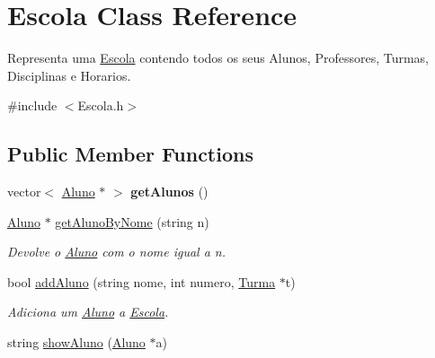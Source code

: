 \hypertarget{class_escola}{\section{Escola Class Reference}
\label{class_escola}
}


Representa uma \hyperlink{class_escola}{Escola} contendo todos os seus Alunos, Professores, Turmas, Disciplinas e Horarios.  




{\ttfamily \#include $<$Escola.\-h$>$}

\subsection*{Public Member Functions}
\begin{DoxyCompactItemize}
\item 
\hypertarget{class_escola_a881727d5171216be19d3e63cf95e2110}{vector$<$ \hyperlink{class_aluno}{Aluno} $\ast$ $>$ {\bfseries get\-Alunos} ()}\label{class_escola_a881727d5171216be19d3e63cf95e2110}

\item 
\hypertarget{class_escola_a7582a678219ca0977bab1ac1db1109f2}{\hyperlink{class_aluno}{Aluno} $\ast$ \hyperlink{class_escola_a7582a678219ca0977bab1ac1db1109f2}{get\-Aluno\-By\-Nome} (string n)}\label{class_escola_a7582a678219ca0977bab1ac1db1109f2}

\begin{DoxyCompactList}\small\item\em Devolve o \hyperlink{class_aluno}{Aluno} com o nome igual a n. \end{DoxyCompactList}\item 
\hypertarget{class_escola_ab8911a8daa03ac6172defbcb68710b06}{bool \hyperlink{class_escola_ab8911a8daa03ac6172defbcb68710b06}{add\-Aluno} (string nome, int numero, \hyperlink{class_turma}{Turma} $\ast$t)}\label{class_escola_ab8911a8daa03ac6172defbcb68710b06}

\begin{DoxyCompactList}\small\item\em Adiciona um \hyperlink{class_aluno}{Aluno} a \hyperlink{class_escola}{Escola}. \end{DoxyCompactList}\item 
\hypertarget{class_escola_a61476572624adfbc5ff2a0dce1e8ce0b}{string \hyperlink{class_escola_a61476572624adfbc5ff2a0dce1e8ce0b}{show\-Aluno} (\hyperlink{class_aluno}{Aluno} $\ast$a)}\label{class_escola_a61476572624adfbc5ff2a0dce1e8ce0b}


\end{DoxyCompactItemize}
